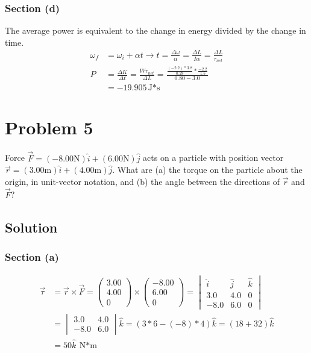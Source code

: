 \documentclass[12pt]{article}
\begin{document}
\subsubsection{Section (d)}
The average power is equivalent to the change in energy divided by the change in time. 
\begin{align}
    \omega_f    &=  \omega_i + \alpha t
        \rightarrow t   =   \frac{\Delta \omega}{\alpha} = \frac{\Delta L}{I\alpha} = \frac{\Delta L}{\tau_{net}}\\
    P   &=  \frac{\Delta K}{\Delta t}
        =   \frac{W\tau_{net}}{\Delta L}
        =   \frac{\frac{(-2.2)*3.8}{0.28}*\frac{-2.2}{1.5}}{0.80 - 3.0}\\
        &=  \boxed{-19.905\unit{\joule*\second}}
\end{align}

\pagebreak
\section{Problem 5}
Force $\vec{F} = (-8.00\unit{\newton})\hat{i} + (6.00\unit{\newton})\hat{j}$ acts on a particle with position vector $\vec{r} = (3.00\unit{\meter})\hat{i} + (4.00\unit{\meter})\hat{j}$. What are (a) the torque on the particle about the origin, in unit-vector notation, and (b) the angle between the directions of $\vec{r}$ and $\vec{F}$?

\subsection{Solution}
\subsubsection{Section (a)}
\begin{align}
    \vec{\tau}  &=  \vec{r}\times\vec{F}
        =   \begin{pmatrix}3.00\\4.00\\0\end{pmatrix} \times \begin{pmatrix}-8.00\\6.00\\0\end{pmatrix}
        =   \begin{vmatrix}
                \hat{i}&\hat{j}&\hat{k}\\
                3.0&4.0&0\\
                -8.0&6.0&0
            \end{vmatrix}\\
        &=  \begin{vmatrix}3.0&4.0\\-8.0&6.0\end{vmatrix}\hat{k}
        =   (3*6 - (-8)*4)\hat{k}
        =   (18 + 32)\hat{k}\\
        &=  \boxed{50\hat{k}\ \unit{\newton*\meter}}
\end{align}
\end{document}
